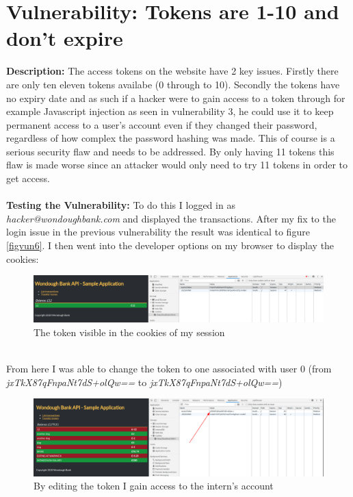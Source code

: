 \section{Vulnerability: Tokens are 1-10 and don't expire}
\label{sec:background}
\textbf{Description:} The access tokens on the website have 2 key issues. Firstly there are only ten eleven tokens availabe (0 through to 10). Secondly the tokens have no expiry
date and as such if a hacker were to gain access to a token through for example Javascript injection as seen in vulnerability 3, he could use it to keep permanent access to a
user's account even if they changed their password, regardless of how complex the password hashing was made. This of course is a serious security flaw and needs to be addressed.
By only having 11 tokens this flaw is made worse since an attacker would only need to try 11 tokens in order to get access. \\ \\
\textbf{Testing the Vulnerability:} To do this I logged in as \textit{hacker@wondoughbank.com} and displayed the transactions. After my fix to the login issue in the previous
vulnerability the result was identical to figure \ref{figvun6}. I then went into the developer options on my browser to display the cookies:
\begin{figure}[h]
    \centering
    \includegraphics[width=1\textwidth]{figs/7.1.png}
    \caption{The token visible in the cookies of my session}
    \label{7.1}
\end{figure}\\
From here I was able to change the token to one associated with user 0 (from \textit{jxTkX87qFnpaNt7dS+olQw==} to \textit{jxTkX87qFnpaNt7dS+olQw==})
\begin{figure}[h]
    \centering
    \includegraphics[width=1\textwidth]{figs/7.2.png}
    \caption{By editing the token I gain access to the intern's account}
    \label{7.2}
\end{figure}\\
